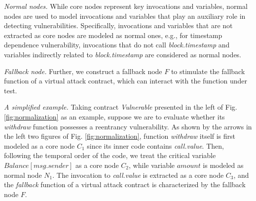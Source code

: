 \textit{Normal nodes.} While core nodes represent key invocations and variables, normal nodes are used to model invocations and variables that play an auxiliary role in detecting vulnerabilities. Specifically, invocations and variables that are not extracted as core nodes are modeled as normal ones, e.g., for timestamp dependence vulnerability, invocations that do not call \emph{block.timestamp} and variables indirectly related to \emph{block.timestamp} are considered as normal nodes.  

\textit{Fallback node.} Further, we construct a fallback node $F$ to stimulate the fallback function of a {virtual} attack contract, which can interact with the function under test. 

\emph{A simplified example.} Taking contract \emph{Vulnerable} presented in the left of Fig. \ref{fig:normalization} as an example, suppose we are to evaluate whether its \emph{withdraw} function possesses a reentrancy vulnerability. As shown by the arrows in the left two figures of Fig. \ref{fig:normalization}, function \emph{withdraw} itself is first modeled as a core node $C_1$ since its inner code contains \emph{call.value}. Then, following the temporal order of the code, we treat the critical variable $Balance[msg.sender]$ as a core node $C_2$, while variable $amount$ is modeled as normal node $N_1$. The invocation to \emph{call.value} is extracted as a core node $C_3$, and the \emph{fallback} function of a virtual attack contract is characterized by the fallback node $F$.

